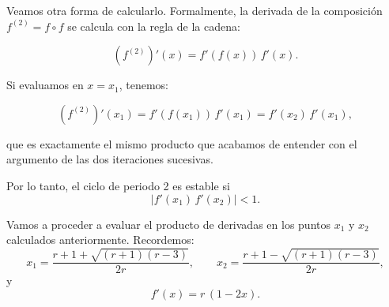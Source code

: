 \documentclass[
  10pt,
  a4paper,
  DIV=11,
  numbers=noendperiod,
  open=any]{scrreprt}
\numberwithin{equation}{chapter}
\numberwithin{equation}{chapter}
\renewcommand{\[}{\begin{equation}}
\renewcommand{\]}{\end{equation}}
\begin{document}
Veamos otra forma de calcularlo. Formalmente, la derivada de la
composición \(f^{(2)}=f\circ f\) se calcula con la regla de la cadena:

\begin{equation}

(f^{(2)})'(x)
= f'(f(x))\,f'(x).

\end{equation}

Si evaluamos en \(x=x_1\), tenemos:

\begin{equation}

(f^{(2)})'(x_1)
= f'(f(x_1))\,f'(x_1)
= f'(x_2)\,f'(x_1),

\end{equation}

que es exactamente el mismo producto que acabamos de entender con el
argumento de las dos iteraciones sucesivas.

Por lo tanto, el ciclo de periodo 2 es estable si\\
\[
\bigl|f'(x_1)\,f'(x_2)\bigr| < 1.
\]

Vamos a proceder a evaluar el producto de derivadas en los puntos
\(x_1\) y \(x_2\) calculados anteriormente. Recordemos: \[
x_1 = \frac{r+1 + \sqrt{(r+1)(r-3)}}{2r},
\qquad
x_2 = \frac{r+1 - \sqrt{(r+1)(r-3)}}{2r},
\] y \[
f'(x) = r\,(1 - 2x).
\]
\end{document}
